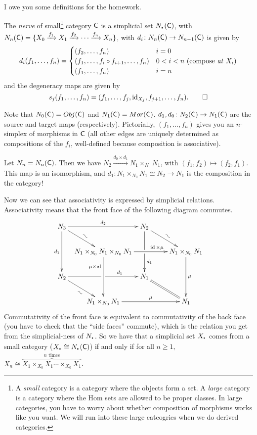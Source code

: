
I owe you some definitions for the homework.
\begin{definition}
 The \emph{nerve} of small\footnote{A \emph{small} category is a category where the objects form a set. A \emph{large} category is a category where the Hom sets are allowed to be proper classes. In large categories, you have to worry about whether composition of morphisms works like you want. We will run into these large cateogries when we do derived categories.} category $\text{\sf C}$ is a simplicial set $N_\udot(\C)$, with $N_n(\text{\sf C})=\{X_0\xrightarrow{f_1} X_1\xrightarrow{f_2}\cdots \xrightarrow{f_n} X_n\}$, with $d_i\colon N_n(\text{\sf C})\to N_{n-1}(\text{\sf C})$ is given by
 \[
  d_i(f_1,\dots, f_n) =
  \begin{cases}
   (f_2,\dots, f_n) & i=0\\
   (f_1,\dots, f_i\circ f_{i+1},\dots, f_n) & 0<i<n \text{ (compose \emph{at} $X_i$)}\\
   (f_1,\dots, f_n) & i=n
  \end{cases}
 \]
 and the degeneracy maps are given by
 \[
  s_j(f_1,\dots, f_n) = (f_1,\dots, f_j, \operatorname{id}_{X_j},f_{j+1},\dots, f_n).\qedhere
 \]
\end{definition}
Note that $N_0(\text{\sf C})=Obj(\text{\sf C})$ and $N_1(\text{\sf C})=Mor(\text{\sf C})$. $d_1,d_0\colon N_2(\text{\sf C})\to N_1(\text{\sf C})$ are the source and target maps (respectively). Pictorially, $(f_1,\dots, f_n)$ gives you an $n$-simplex of morphisms in $\text{\sf C}$ (all other edges are uniquely determined as compositions of the $f_i$, well-defined because composition is associative).

Let $N_n=N_n(\text{\sf C})$. Then we have $N_2\xrightarrow{d_0\times d_1} N_1\times_{N_0}N_1$, with $(f_1,f_2)\mapsto (f_2,f_1)$. This map is an isomorphism, and $d_1\colon N_1\times_{N_0}N_1\cong N_2\to N_1$ is the composition in the category!

Now we can see that associativity is expressed by simplicial relations. Associativity means that the front face of the following diagram commutes.
\[\xymatrix@!0 @R+1pc @C+3pc{
 N_3 \ar[dd]_{d_1} \ar[dr]^@{~} \ar[rr]^{d_2} & & N_2\ar[dr]^@{~} \ar[dd]|\hole^(.7){d_1}\\
 & N_1\times_{N_0}N_1\times_{N_0}N_1 \ar[rr]^(.65){\id\times \mu} \ar[dd]_(.3){\mu\times \id} & & N_1\times_{N_0}N_1 \ar[dd]^\mu\\
 N_2\ar[dr]_@{~} \ar[rr]^(.7){d_1}|\hole & & N_1\ar@{=}[dr]\\
 & N_1\times_{N_0}N_1\ar[rr]^-{\mu} & & N_1
}\]
Commutativity of the front face is equivalent to commutativity of the back face (you have to check that the ``side faces'' commute), which is the relation you get from the simplicial-ness of $N_\udot$. So we have that a simplicial set $X_\udot$ comes from a small category ($X_\udot\cong N_\udot(\C)$) if and only if for all $n\ge 1$, $X_n\cong \overbrace{X_1\times_{X_0}X_1\cdots \times_{X_0}X_1}^\text{$n$ times}$.

